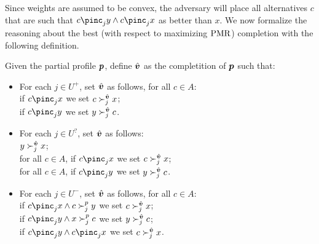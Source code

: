 Since weights are assumed to be convex, the adversary will place all alternatives $c$ that are such that $c \pinc_{j} y \wedge c \pinc_{j} x$ as better than $x$.
We now formalize the reasoning about the best (with respect to maximizing $\operatorname{PMR}$) completion with the following definition.
\begin{definition}
Given the partial profile ${\bm{p}}$, define $\hat{\bm{v}}$ as the completition of ${\bm{p}}$ such that:
\begin{itemize}
\item For each $j \in U^{+}$, set   $\hat{\bm{v}}$ as follows, for all $c \in A$:\\
if $c \pinc_{j} x$ we set $c \succ_{j}^{\hat{\bm{v}}} x$;\\
if  $c \pinc_{j} y$ we set $y \succ_{j}^{\hat{\bm{v}}} c$.
\item For each $j \in U^{?}$, set  $\hat{\bm{v}}$ as follows:\\
$y \succ_{j}^{\hat{\bm{v}}} x$;\\
for all $c \in A$, if   $c \pinc_{j} x$ we set $c \succ_{j}^{\hat{\bm{v}}} x$;\\
for all $c \in A$, if   $c \pinc_{j} y$ we set $y \succ_{j}^{\hat{\bm{v}}} c$.
\item For each $j \in U^{-}$,  set  $\hat{\bm{v}}$ as follows, for all $c \in A$:\\
if $c \pinc_{j} x \wedge c \succ^{p}_{j} y$ we set $c \succ_{j}^{\hat{\bm{v}}} x$;\\
if $c \pinc_{j} y \wedge  x \succ^{p}_{j} c$ we set $y \succ_{j}^{\hat{\bm{v}}} c$;\\
if $c \pinc_{j} y \wedge c \pinc_{j} x$ we set $c \succ_{j}^{\hat{\bm{v}}} x$.
\end{itemize}
\end{definition}



